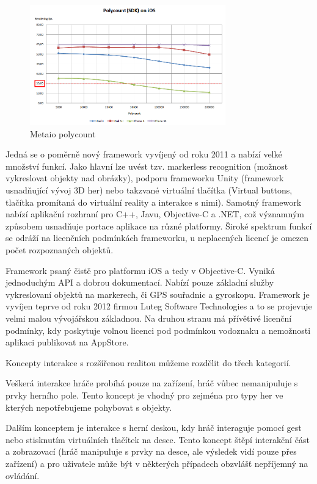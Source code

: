 \documentclass[oneside,12pt]{article}
\begin{document}
\begin{figure}[H]
    \includegraphics[width=320px, center]{Polycount_SDK_iOS_20fps.png}
    \caption{Metaio polycount}
    \label{fig:awesome_image}
\end{figure}


Jedná se o poměrně nový framework vyvíjený od roku 2011 a nabízí velké množství funkcí. Jako hlavní lze uvést tzv. markerless recognition (možnost vykreslovat objekty nad obrázky), podporu frameworku Unity (framework usnadňující vývoj 3D her) nebo takzvané virtuální tlačítka (Virtual buttons, tlačítka promítaná do virtuální reality a interakce s nimi). Samotný framework nabízí aplikační rozhraní pro C++, Javu, Objective-C a .NET, což významným způsobem usnadňuje portace aplikace na různé platformy. Široké spektrum funkcí se odráží na licenčních podmínkách frameworku, u neplacených licencí je omezen počet rozpoznaných objektů. 

Framework psaný čistě pro platformu iOS a tedy v Objective-C. Vyniká jednoduchým API a dobrou dokumentací. Nabízí pouze základní služby vykreslovaní objektů na markerech, či GPS souřadnic a gyroskopu. Framework je vyvíjen teprve od roku 2012 firmou Luteg Software Technologies a to se projevuje velmi malou vývojářskou základnou. Na druhou stranu má přívětivé licenční podmínky, kdy poskytuje volnou licenci pod podmínkou vodoznaku a nemožnosti aplikaci publikovat na AppStore. 

Koncepty interakce s rozšířenou realitou můžeme rozdělit do třech kategorií.

Veškerá interakce hráče probíhá pouze na zařízení, hráč vůbec nemanipuluje s prvky herního pole. Tento koncept je vhodný pro zejména pro typy her ve kterých nepotřebujeme pohybovat s objekty.

Dalším konceptem je interakce s herní deskou, kdy hráč interaguje pomocí gest nebo stisknutím virtuálních tlačítek na desce. Tento koncept štěpí interakční část a zobrazovací (hráč manipuluje s prvky na desce, ale výsledek vidí pouze přes zařízení) a pro uživatele může být v některých případech obzvlášť nepříjemný na ovládání.
\end{document}
